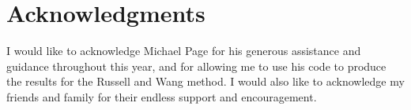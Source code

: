 \section*{Acknowledgments}

I would like to acknowledge Michael Page for his generous assistance and guidance throughout this year, and for allowing me to use his code to produce the results for the Russell and Wang method.
I would also like to acknowledge my friends and family for their endless support and encouragement.
